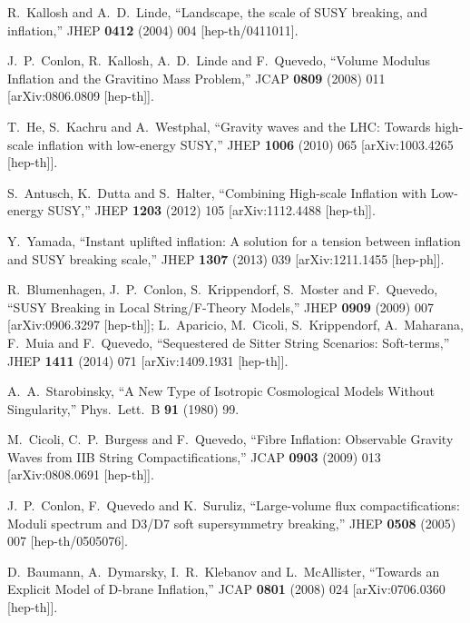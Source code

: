 \documentclass[11pt,a4paper]{article}
\begin{document}
\begin{thebibliography}{99}

  R.~Kallosh and A.~D.~Linde,
  ``Landscape, the scale of SUSY breaking, and inflation,''
  JHEP {\bf 0412} (2004) 004
  [hep-th/0411011].

  J.~P.~Conlon, R.~Kallosh, A.~D.~Linde and F.~Quevedo,
  ``Volume Modulus Inflation and the Gravitino Mass Problem,''
  JCAP {\bf 0809} (2008) 011
  [arXiv:0806.0809 [hep-th]].

  T.~He, S.~Kachru and A.~Westphal,
  ``Gravity waves and the LHC: Towards high-scale inflation with low-energy SUSY,''
  JHEP {\bf 1006} (2010) 065
  [arXiv:1003.4265 [hep-th]].

  S.~Antusch, K.~Dutta and S.~Halter,
  ``Combining High-scale Inflation with Low-energy SUSY,''
  JHEP {\bf 1203} (2012) 105
  [arXiv:1112.4488 [hep-th]].

  Y.~Yamada,
  ``Instant uplifted inflation: A solution for a tension between inflation and SUSY breaking scale,''
  JHEP {\bf 1307} (2013) 039
  [arXiv:1211.1455 [hep-ph]].
	
  R.~Blumenhagen, J.~P.~Conlon, S.~Krippendorf, S.~Moster and F.~Quevedo,
  ``SUSY Breaking in Local String/F-Theory Models,''
  JHEP {\bf 0909} (2009) 007
  [arXiv:0906.3297 [hep-th]]; L.~Aparicio, M.~Cicoli, S.~Krippendorf, A.~Maharana, F.~Muia and F.~Quevedo,
  ``Sequestered de Sitter String Scenarios: Soft-terms,''
  JHEP {\bf 1411} (2014) 071
  [arXiv:1409.1931 [hep-th]].

  A.~A.~Starobinsky,
  ``A New Type of Isotropic Cosmological Models Without Singularity,''
  Phys.\ Lett.\ B {\bf 91} (1980) 99.

  M.~Cicoli, C.~P.~Burgess and F.~Quevedo,
  ``Fibre Inflation: Observable Gravity Waves from IIB String Compactifications,''
  JCAP {\bf 0903} (2009) 013
  [arXiv:0808.0691 [hep-th]].

  J.~P.~Conlon, F.~Quevedo and K.~Suruliz,
  ``Large-volume flux compactifications: Moduli spectrum and D3/D7 soft supersymmetry breaking,''
  JHEP {\bf 0508} (2005) 007
  [hep-th/0505076].

  D.~Baumann, A.~Dymarsky, I.~R.~Klebanov and L.~McAllister,
  ``Towards an Explicit Model of D-brane Inflation,''
  JCAP {\bf 0801} (2008) 024
  [arXiv:0706.0360 [hep-th]].


\end{thebibliography}
\end{document}
